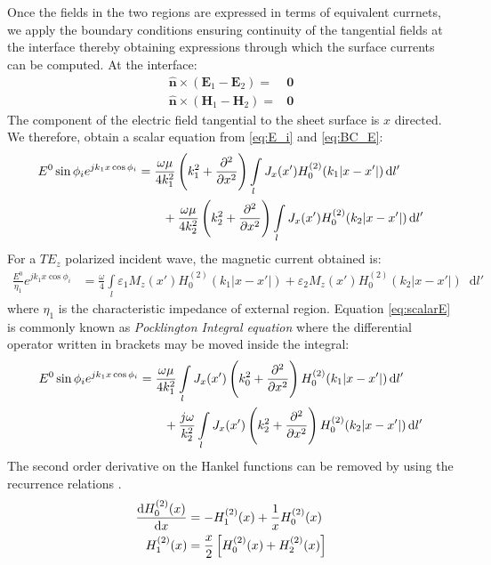 \documentclass[11pt]{article}
\renewcommand{\v}[1]{\mathbf{#1}} %
\renewcommand{\O}{\omega}  %
\newcommand{\E}{\varepsilon}  %
\renewcommand{\u}{\mu}  %
\newcommand{\x}{\times}  %
\renewcommand{\^}{\hat}  %
\newcommand*\diff{\mathop{}\!\mathrm{d}} %
\begin{document}
Once the fields in the two regions are expressed in terms of equivalent currnets, we apply the boundary conditions ensuring continuity of the tangential fields at the interface thereby obtaining expressions through which the surface currents can be computed. At the interface:
%
\begin{subequations}
  \begin{align}
    \hat{\v n} \x (\v E_1 - \v E_2) ={}& \v 0
    \label{eq:BC_E}\\
    \hat{\v n} \x (\v H_1 - \v H_2) ={}& \v 0
    \label{eq:BC_H}
  \end{align}
  \label{eq:BC}
\end{subequations}
%
The component of the electric field tangential to the sheet surface is $x$ directed. We therefore, obtain a scalar equation from \eqref{eq:E_i} and \eqref{eq:BC_E}:
%
\begin{align}
  E^0 \sin \phi_i  e^{j k_1 x \cos \phi_i} &=  \frac{\O \u}{4 k_1^2}\left(k_1^2 +  \pdv[2]{}{x} \right) \int\limits_{l} J_x(x') H_0^{(2)}(k_1 |x - x'|) \diff{l'} \notag\\
  &\qquad + \frac{\O \u}{4 k_2^2}\left(k_2^2 +  \pdv[2]{}{x} \right) \int\limits_{l} J_x(x') H_0^{(2)}(k_2 |x - x'|) \diff{l'}
  \label{eq:scalarE}
\end{align}
%
For a $TE_z$ polarized incident wave, the magnetic current obtained is:
%
\begin{align}
  \frac{E^0}{\eta_1} e^{j k_1 x \cos \phi_i} &=  \frac{\O}{4} \int\limits_{l} \E_1 M_z(x') H_0^{(2)}(k_1 |x - x'|)  +  \E_2 M_z(x') H_0^{(2)}(k_2 |x - x'|) \diff{l'}
  \label{eq:scalarH}
\end{align}
%
where $\eta_1$ is the characteristic impedance of external region. Equation  \eqref{eq:scalarE} is commonly known as \emph{Pocklington Integral equation} where the differential operator written in brackets may be moved inside the integral:
%
\begin{align}
  E^0 \sin \phi_i  e^{j k_1 x \cos \phi_i}  &=  \frac{\O \u}{4 k_1^2} \int\limits_{l} J_x(x') \left(k_0^2 +  \pdv[2]{}{x} \right) H_0^{(2)}(k_1 |x - x'|) \diff{l'} \notag\\
  &\qquad + \frac{j \O}{k_2^2} \int\limits_{l} J_x(x') \left(k_2^2 +  \pdv[2]{}{x} \right) H_0^{(2)}(k_2 |x - x'|) \diff{l'}
  \label{eq:scalarE_pock}
\end{align}
%
The second order derivative on the Hankel functions can be removed by using the recurrence relations \cite[p. 361]{}.
%
\begin{subequations}
  \begin{align}
    \dv{H_0^{(2)}(x)}{x} &= -H_{1}^{(2)}(x) + \frac{1}{x} H_0^{(2)}(x)
    \label{eq:Hankel_ID1}\\
    H_{1}^{(2)}(x)  &= \frac{x}{2} \left[H_{0}^{(2)}(x) + H_{2}^{(2)}(x)\right]
    \label{eq:Hankel_ID2}
  \end{align}
  \label{eq:Hankel_ID}
\end{subequations}
\end{document}
